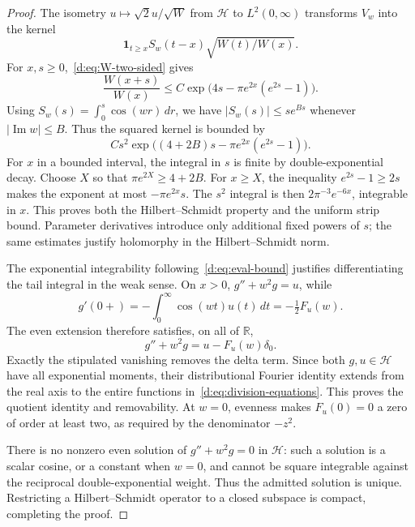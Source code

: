 \documentclass[11pt,a4paper]{article}
\numberwithin{equation}{section}
\theoremstyle{definition}\newtheorem{definition}[theorem]{Definition}
\theoremstyle{remark}\newtheorem{remark}[theorem]{Remark}
\newcommand{\R}{\mathbb R}\newcommand{\C}{\mathbb C}\newcommand{\N}{\mathbb N}
\newcommand{\Hh}{\mathcal H}\newcommand{\Hw}{\mathcal H}
\begin{document}
\begin{proof}
The isometry $u\mapsto\sqrt2u/\sqrt W$ from $\Hh$ to $L^2(0,\infty)$ transforms $V_w$ into the kernel
\[
 \boldsymbol1_{t\ge x}S_w(t-x)\sqrt{W(t)/W(x)}.
\]
For $x,s\ge0$,~\eqref{d:eq:W-two-sided} gives
\begin{equation}\label{d:eq:weight-ratio}
 \frac{W(x+s)}{W(x)}\le C\exp\bigl(4s-\pi e^{2x}(e^{2s}-1)\bigr).
\end{equation}
Using $S_w(s)=\int_0^s\cos(wr)\,dr$, we have $|S_w(s)|\le s e^{Bs}$ whenever $|\operatorname{Im}w|\le B$. Thus the squared kernel is bounded by
\begin{equation}\label{d:eq:HS-majorant}
 Cs^2\exp\bigl((4+2B)s-\pi e^{2x}(e^{2s}-1)\bigr).
\end{equation}
For $x$ in a bounded interval, the integral in $s$ is finite by double-exponential decay. Choose $X$ so that $\pi e^{2X}\ge4+2B$. For $x\ge X$, the inequality $e^{2s}-1\ge2s$ makes the exponent at most $-\pi e^{2x}s$. The $s^2$ integral is then $2\pi^{-3}e^{-6x}$, integrable in $x$. This proves both the Hilbert--Schmidt property and the uniform strip bound. Parameter derivatives introduce only additional fixed powers of $s$; the same estimates justify holomorphy in the Hilbert--Schmidt norm.

The exponential integrability following~\eqref{d:eq:eval-bound} justifies differentiating the tail integral in the weak sense. On $x>0$,
$g''+w^2g=u$, while
\begin{equation}\label{d:eq:jump}
 g'(0+)=-\int_0^\infty\cos(wt)u(t)\,dt=-\tfrac12F_u(w).
\end{equation}
The even extension therefore satisfies, on all of $\R$,
\begin{equation}\label{d:eq:jump-distribution}
 g''+w^2g=u-F_u(w)\delta_0.
\end{equation}
Exactly the stipulated vanishing removes the delta term. Since both $g,u\in\Hh$ have all exponential moments, their distributional Fourier identity extends from the real axis to the entire functions in~\eqref{d:eq:division-equations}. This proves the quotient identity and removability. At $w=0$, evenness makes $F_u(0)=0$ a zero of order at least two, as required by the denominator $-z^2$.

There is no nonzero even solution of $g''+w^2g=0$ in $\Hh$: such a solution is a scalar cosine, or a constant when $w=0$, and cannot be square integrable against the reciprocal double-exponential weight. Thus the admitted solution is unique. Restricting a Hilbert--Schmidt operator to a closed subspace is compact, completing the proof.
\end{proof}
\end{document}
